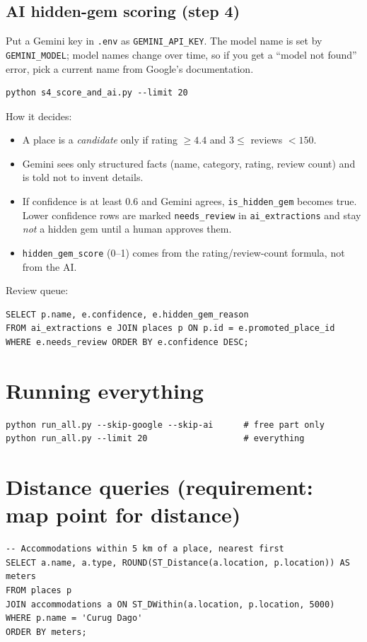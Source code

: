 \documentclass[11pt,a4paper]{article}
\begin{document}
\subsection{AI hidden-gem scoring (step 4)}
Put a Gemini key in \texttt{.env} as \texttt{GEMINI\_API\_KEY}. The model name is set by \texttt{GEMINI\_MODEL}; model names change over time, so if you get a ``model not found'' error, pick a current name from Google's documentation.
\begin{lstlisting}
python s4_score_and_ai.py --limit 20
\end{lstlisting}
How it decides:
\begin{itemize}[leftmargin=*]
\item A place is a \emph{candidate} only if rating $\ge 4.4$ and $3 \le$ reviews $< 150$.
\item Gemini sees only structured facts (name, category, rating, review count) and is told not to invent details.
\item If confidence is at least 0.6 and Gemini agrees, \texttt{is\_hidden\_gem} becomes true. Lower confidence rows are marked \texttt{needs\_review} in \texttt{ai\_extractions} and stay \emph{not} a hidden gem until a human approves them.
\item \texttt{hidden\_gem\_score} (0--1) comes from the rating/review-count formula, not from the AI.
\end{itemize}
Review queue:
\begin{lstlisting}
SELECT p.name, e.confidence, e.hidden_gem_reason
FROM ai_extractions e JOIN places p ON p.id = e.promoted_place_id
WHERE e.needs_review ORDER BY e.confidence DESC;
\end{lstlisting}

\section{Running everything}
\begin{lstlisting}
python run_all.py --skip-google --skip-ai      # free part only
python run_all.py --limit 20                   # everything
\end{lstlisting}

\section{Distance queries (requirement: map point for distance)}
\begin{lstlisting}
-- Accommodations within 5 km of a place, nearest first
SELECT a.name, a.type, ROUND(ST_Distance(a.location, p.location)) AS meters
FROM places p
JOIN accommodations a ON ST_DWithin(a.location, p.location, 5000)
WHERE p.name = 'Curug Dago'
ORDER BY meters;
\end{lstlisting}
\end{document}
